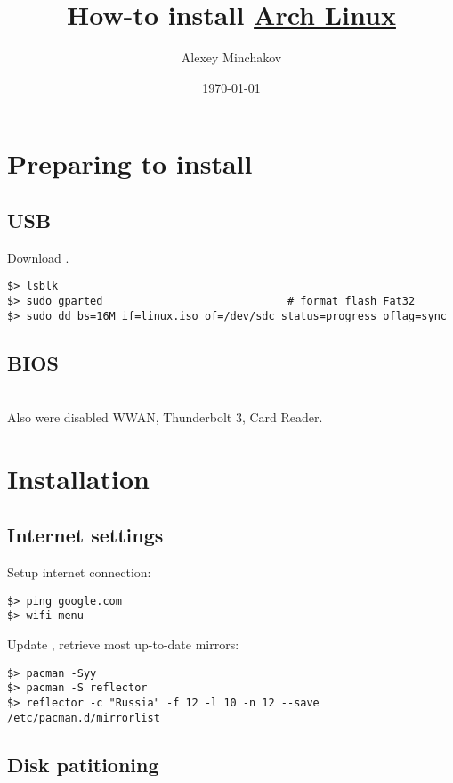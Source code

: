 \documentclass[a4paper, 12pt]{article}
\title{How-to install \url{Arch Linux}}
\author{Alexey Minchakov}
\date{\today}
\begin{document}
\maketitle
\tableofcontents

\section{Preparing to install}
\subsection{USB}

Download .
\begin{lstlisting}
$> lsblk
$> sudo gparted                             # format flash Fat32
$> sudo dd bs=16M if=linux.iso of=/dev/sdc status=progress oflag=sync
\end{lstlisting}

\subsection{BIOS}

\\Also were disabled WWAN, Thunderbolt 3, Card Reader.

\section{Installation}
\subsection{Internet settings}

Setup internet connection:
\begin{lstlisting}
$> ping google.com
$> wifi-menu
\end{lstlisting}

Update , retrieve most up-to-date mirrors:
\begin{lstlisting}
$> pacman -Syy
$> pacman -S reflector
$> reflector -c "Russia" -f 12 -l 10 -n 12 --save /etc/pacman.d/mirrorlist
\end{lstlisting}

\subsection{Disk patitioning}
\end{document}
